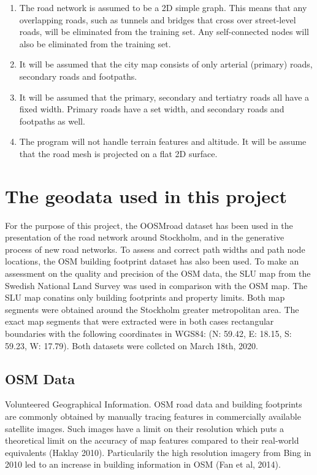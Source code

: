 \documentclass[a4paper]{article}
\begin{document}
\begin{enumerate}
\item The road network is assumed to be a 2D simple graph. This means that any overlapping roads, such as tunnels and bridges that cross over street-level roads, will be eliminated from the training set. Any self-connected nodes will also be eliminated from the training set.
\item It will be assumed that the city map consists of only arterial (primary) roads, secondary roads and footpaths.
\item It will be assumed that the primary, secondary and tertiatry roads all have a fixed width. Primary roads have a set width, and secondary roads and footpaths as well.
\item The program will not handle terrain features and altitude. It will be assume that the road mesh is projected on a flat 2D surface.
\end{enumerate}

\section{The geodata used in this project}

For the purpose of this project, the OOSMroad dataset has been used in the presentation of the road network around Stockholm, and in the generative process of new road networks. To assess and correct path widths and path node locations, the OSM building footprint dataset has also been used. To make an assessment on the quality and precision of the OSM data, the SLU map from the Swedish National Land Survey was used in comparison with the OSM map. The SLU map conatins only building footprints and property limits. Both map segments were obtained around the Stockholm greater metropolitan area.
The exact map segments that were extracted were in both cases rectangular boundaries with the following coordinates in WGS84: (N: 59.42, E: 18.15, S: 59.23, W: 17.79).
Both datasets were collcted on March 18th, 2020.

\subsection{OSM Data}

Volunteered Geographical Information.
OSM road data and building footprints are commonly obtained by manually tracing features in commercially available satellite images. Such images have a limit on their resolution which puts a theoretical limit on the accuracy of map features compared to their real-world equivalents (Haklay 2010). Particularily the high resolution imagery from Bing in 2010 led to an increase in building information in OSM (Fan et al, 2014).
\end{document}
